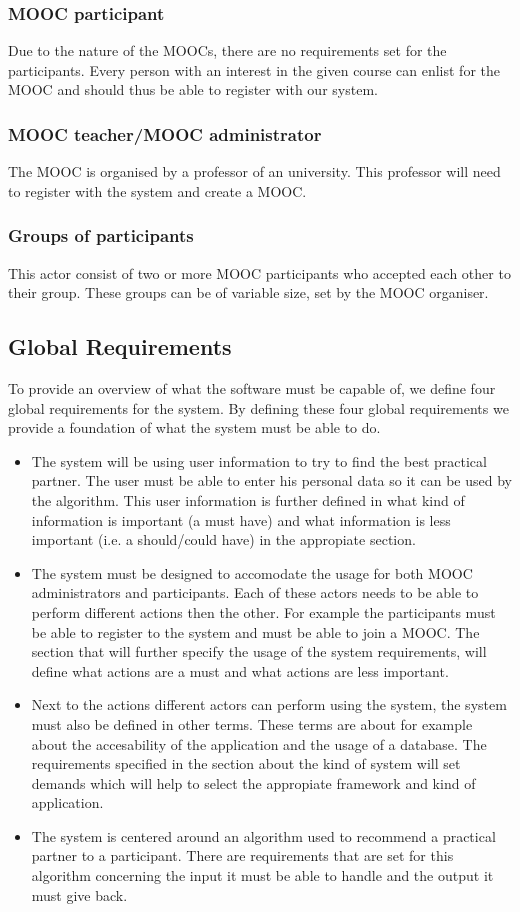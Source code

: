 \documentclass[]{article}
\begin{document}
\subsubsection{MOOC participant}
Due to the nature of the MOOCs, there are no requirements set for the participants.
Every person with an interest in the given course can enlist for the MOOC and should thus be able to register with our system.
\subsubsection{MOOC teacher/MOOC administrator} 
The MOOC is organised by a professor of an university.
This professor will need to register with the system and create a MOOC.
\subsubsection{Groups of participants}
This actor consist of two or more MOOC participants who accepted each other to their group.
These groups can be of variable size, set by the MOOC organiser.

\subsection{Global Requirements}
To provide an overview of what the software must be capable of, we define four global requirements for the system.
By defining these four global requirements we provide a foundation of what the system must be able to do.
\begin{itemize}
\item The system will be using user information to try to find the best practical partner.
The user must be able to enter his personal data so it can be used by the algorithm.
This user information is further defined in what kind of information is important (a must have) and what information is less important (i.e. a should/could have) in the appropiate section.
\item The system must be designed to accomodate the usage for both MOOC administrators and participants.
Each of these actors needs to be able to perform different actions then the other.
For example the participants must be able to register to the system and must be able to join a MOOC.
The section that will further specify the usage of the system requirements, will define what actions are a must and what actions are less important.
\item Next to the actions different actors can perform using the system, the system must also be defined in other terms.
These terms are about for example about the accesability of the application and the usage of a database.
The requirements specified in the section about the kind of system will set demands which will help to select the appropiate framework and kind of application.
\item The system is centered around an algorithm used to recommend a practical partner to a participant.
There are requirements that are set for this algorithm concerning the input it must be able to handle and the output it must give back.
\end{itemize}
\end{document}
